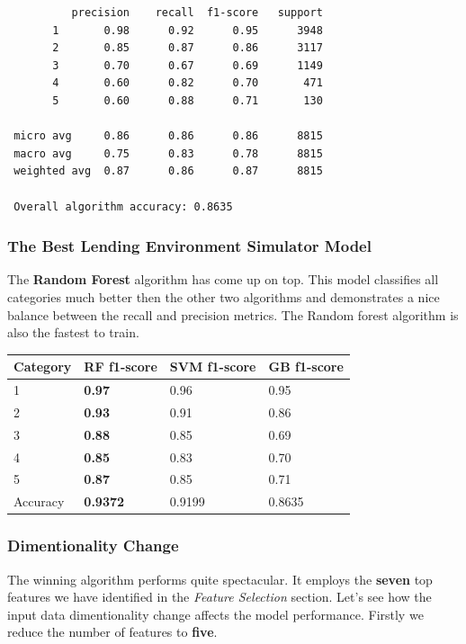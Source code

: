 \begin{verbatim}
          precision    recall  f1-score   support
       1       0.98      0.92      0.95      3948
       2       0.85      0.87      0.86      3117
       3       0.70      0.67      0.69      1149
       4       0.60      0.82      0.70       471
       5       0.60      0.88      0.71       130
       
 micro avg     0.86      0.86      0.86      8815
 macro avg     0.75      0.83      0.78      8815
 weighted avg  0.87      0.86      0.87      8815
 
 Overall algorithm accuracy: 0.8635
\end{verbatim}

\hypertarget{the-best-lending-environment-simulator-model}{%
\subsubsection{The Best Lending Environment Simulator
Model}\label{the-best-lending-environment-simulator-model}}

The \textbf{Random Forest} algorithm has come up on top. This model
classifies all categories much better then the other two algorithms and
demonstrates a nice balance between the recall and precision metrics.
The Random forest algorithm is also the fastest to train.

\begin{longtable}[]{@{}llll@{}}
\toprule
Category & \textbf{RF f1-score} & SVM f1-score & GB
f1-score\tabularnewline
\midrule
\endhead
1 & \textbf{0.97} & 0.96 & 0.95\tabularnewline
2 & \textbf{0.93} & 0.91 & 0.86\tabularnewline
3 & \textbf{0.88} & 0.85 & 0.69\tabularnewline
4 & \textbf{0.85} & 0.83 & 0.70\tabularnewline
5 & \textbf{0.87} & 0.85 & 0.71\tabularnewline
Accuracy & \textbf{0.9372} & 0.9199 & 0.8635\tabularnewline
\bottomrule
\end{longtable}

\hypertarget{dimentionality-change}{%
\subsubsection{Dimentionality Change}\label{dimentionality-change}}

The winning algorithm performs quite spectacular. It employs the
\textbf{seven} top features we have identified in the \emph{Feature
Selection} section. Let's see how the input data dimentionality change
affects the model performance. Firstly we reduce the number of features
to \textbf{five}.

